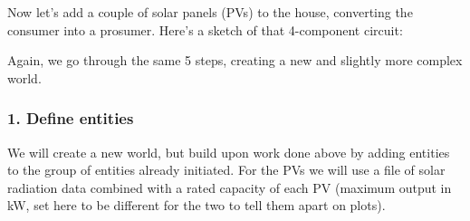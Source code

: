\documentclass[11pt]{article}
\begin{document}
    Now let's add a couple of solar panels (PVs) to the house, converting
the consumer into a prosumer. Here's a sketch of that 4-component
circuit:

Again, we go through the same 5 steps, creating a new and slightly more
complex world.

    \subsubsection{1. Define entities}\label{define-entities}

We will create a new world, but build upon work done above by adding
entities to the group of entities already initiated. For the PVs we will
use a file of solar radiation data combined with a rated capacity of
each PV (maximum output in kW, set here to be different for the two to
tell them apart on plots).
\end{document}
